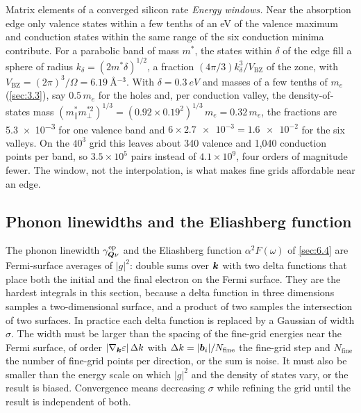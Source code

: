 \begin{workedexample}{Matrix elements of a converged silicon rate}
\emph{Energy windows.} Near the absorption edge only valence states within a few tenths of an eV of the valence maximum and conduction states within the same range of the six conduction minima contribute. For a parabolic band of mass $m^*$, the states within $\delta$ of the edge fill a sphere of radius $k_\delta = (2m^*\delta)^{1/2}$, a fraction $(4\pi/3)k_\delta^3/V_{\mathrm{BZ}}$ of the zone, with $V_{\mathrm{BZ}} = (2\pi)^3/\Omega = \SI{6.19}{\angstrom^{-3}}$. With $\delta = \SI{0.3}{eV}$ and masses of a few tenths of $m_e$ (\cref{sec:3.3}), say $0.5\,m_e$ for the holes and, per conduction valley, the density-of-states mass $(m^*_\parallel m^{*2}_\perp)^{1/3} = (0.92\times0.19^2)^{1/3}\,m_e = 0.32\,m_e$, the fractions are \num{5.3e-3} for one valence band and $6\times\num{2.7e-3} = \num{1.6e-2}$ for the six valleys. On the $40^3$ grid this leaves about 340 valence and 1{,}040 conduction points per band, so $3.5\times10^5$ pairs instead of $4.1\times10^9$, four orders of magnitude fewer. The window, not the interpolation, is what makes fine grids affordable near an edge.
\end{workedexample}

\subsection{Phonon linewidths and the Eliashberg function}

The phonon linewidth $\gamma^{\mathrm{ep}}_{\bm{Q}\nu}$ and the Eliashberg function $\alpha^2F(\omega)$ of \cref{sec:6.4} are Fermi-surface averages of $|g|^2$: double sums over $\bm{k}$ with two delta functions that place both the initial and the final electron on the Fermi surface. They are the hardest integrals in this section, because a delta function in three dimensions samples a two-dimensional surface, and a product of two samples the intersection of two surfaces. In practice each delta function is replaced by a Gaussian of width $\sigma$. The width must be larger than the spacing of the fine-grid energies near the Fermi surface, of order $|\nabla_{\bm{k}}\varepsilon|\,\Delta k$ with $\Delta k = |\bm{b}_i|/N_{\mathrm{fine}}$ the fine-grid step and $N_{\mathrm{fine}}$ the number of fine-grid points per direction, or the sum is noise. It must also be smaller than the energy scale on which $|g|^2$ and the density of states vary, or the result is biased. Convergence means decreasing $\sigma$ while refining the grid until the result is independent of both.

